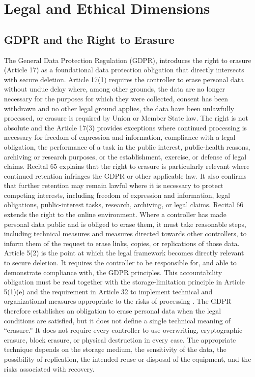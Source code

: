 \section{Legal and Ethical Dimensions}

\subsection{GDPR and the Right to Erasure}
The General Data Protection Regulation (GDPR), introduces the right to 
erasure (Article 17) as a foundational data protection obligation that directly intersects with 
secure deletion. Article 17(1) requires the controller to erase personal data without undue delay 
where, among other grounds, the data are no longer necessary for the purposes for which they were 
collected, consent has been withdrawn and no other legal ground applies, the data have been 
unlawfully processed, or erasure is required by Union or Member State law. The right is not absolute 
and the Article 17(3) provides exceptions where continued processing is necessary for freedom of expression 
and information, compliance with a legal obligation, the performance of a task in the public interest, 
public-health reasons, archiving or research purposes, or the establishment, exercise, or defense of legal 
claims. Recital 65 explains that the right to erasure is particularly relevant where continued retention 
infringes the GDPR or other applicable law. It also confirms that further retention may remain lawful 
where it is necessary to protect competing interests, including freedom of expression and information, 
legal obligations, public-interest tasks, research, archiving, or legal claims. Recital 66 extends 
the right to the online environment. Where a controller has made personal data public and is obliged to 
erase them, it must take reasonable steps, including technical measures and measures directed towards 
other controllers, to inform them of the request to erase links, copies, or replications of those data. 
Article 5(2) is the point at which the legal framework becomes directly relevant to secure deletion. It 
requires the controller to be responsible for, and able to demonstrate compliance with, the GDPR principles. 
This accountability obligation must be read together with the storage-limitation principle in Article 5(1)(e) 
and the requirement in Article 32 to implement technical and organizational measures appropriate to the risks 
of processing \cite{gdpr2016}. The GDPR therefore establishes an obligation to erase personal data when the legal 
conditions are satisfied, but it does not define a single technical meaning of “erasure.” It does not require every 
controller to use overwriting, cryptographic erasure, block erasure, or physical destruction in every case. The 
appropriate technique depends on the storage medium, the sensitivity of the data, the possibility of replication, 
the intended reuse or disposal of the equipment, and the risks associated with recovery.

